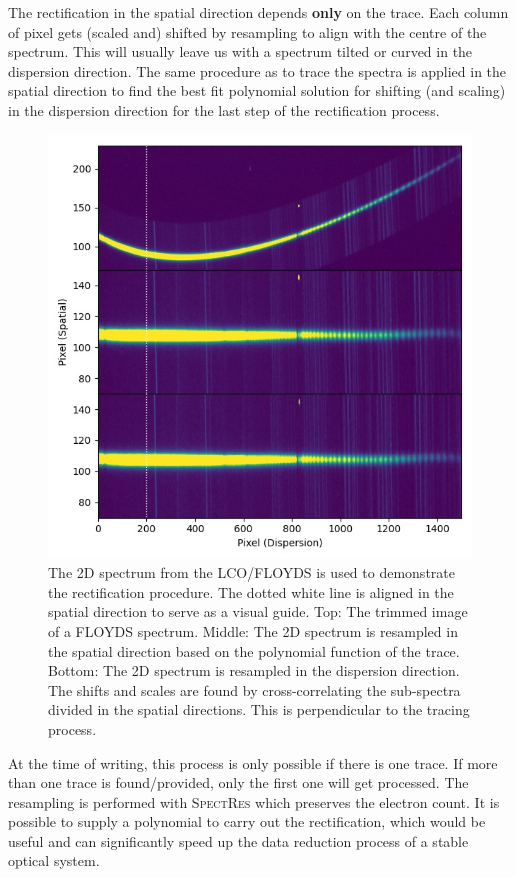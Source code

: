 \documentclass[fleqn,usenatbib]{mnras}
\begin{document}
The rectification in the spatial direction depends \textbf{only}
on the trace. Each column of pixel gets (scaled and) shifted by
resampling to align with the centre of the spectrum. This will
usually leave us with a spectrum tilted or curved in the dispersion
direction. The same procedure as to trace the spectra is applied
in the spatial direction to find the best fit polynomial solution
for shifting (and scaling) in the dispersion direction for the
last step of the rectification process.

\begin{figure}
    \centering
    \includegraphics[width=\columnwidth]{fig_02_rectification.jpg}
    \caption{The 2D spectrum from the LCO/FLOYDS is used to
    demonstrate the rectification procedure. The dotted white line
    is aligned in the spatial direction to serve as a visual guide.
    Top: The trimmed image of a FLOYDS spectrum. Middle: The 2D
    spectrum is resampled in the spatial direction based on the
    polynomial function of the trace. Bottom: The 2D spectrum is
    resampled in the dispersion direction. The shifts and scales
    are found by cross-correlating the sub-spectra divided in the
    spatial directions. This is perpendicular to the tracing process.}
    \label{fig:rectify}
\end{figure}

At the time of writing, this process is only possible if there is
one trace. If more than one trace is found/provided, only the first
one will get processed. The resampling is performed with
\textsc{SpectRes} which preserves the electron count. It is possible
to supply a polynomial to carry out the rectification, which would
be useful and can significantly speed up the data reduction process
of a stable optical system.
\end{document}
